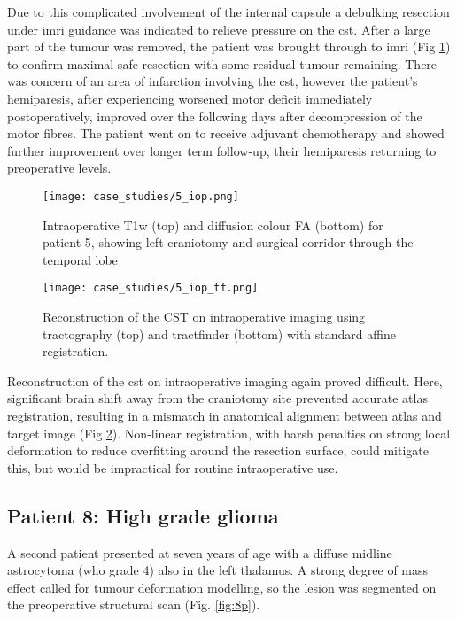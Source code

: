 Due to this complicated involvement of the internal capsule a debulking resection under \gls{imri} guidance was indicated to relieve pressure on the \gls{cst}.
After a large part of the tumour was removed, the patient was brought through to \gls{imri} (Fig \ref{fig:5i}) to confirm maximal safe resection with some residual tumour remaining.
There was concern of an area of infarction involving the \gls{cst}, however the patient's hemiparesis, after experiencing worsened motor deficit immediately postoperatively, improved over the following days after decompression of the motor fibres.
The patient went on to receive adjuvant chemotherapy and showed further improvement over longer term follow-up, their hemiparesis returning to preoperative levels.

\begin{figure}
  \centering
  \texttt{[image: case\_studies/5\_iop.png]}
  \caption{Intraoperative T1w (top) and diffusion colour FA (bottom) for patient 5, showing left craniotomy and surgical corridor through the temporal lobe}
  \label{fig:5i}
\end{figure}

\begin{figure}
  \centering
  \texttt{[image: case\_studies/5\_iop\_tf.png]}
  \caption{Reconstruction of the CST on intraoperative imaging using tractography (top) and tractfinder (bottom) with standard affine registration.}
  \label{fig:5i_cst}
\end{figure}

Reconstruction of the \gls{cst} on intraoperative imaging again proved difficult.
Here, significant brain shift away from the craniotomy site prevented accurate atlas registration, resulting in a mismatch in anatomical alignment between atlas and target image (Fig \ref{fig:5i_cst}).
Non-linear registration, with harsh penalties on strong local deformation to reduce overfitting around the resection surface, could mitigate this, but would be impractical for routine intraoperative use.

\subsection{Patient 8: High grade glioma}

A second patient presented at seven years of age with a diffuse midline astrocytoma (\gls{who} grade 4) also in the left thalamus.
A strong degree of mass effect called for tumour deformation modelling, so the lesion was segmented on the preoperative structural scan (Fig. \ref{fig:8p}).


